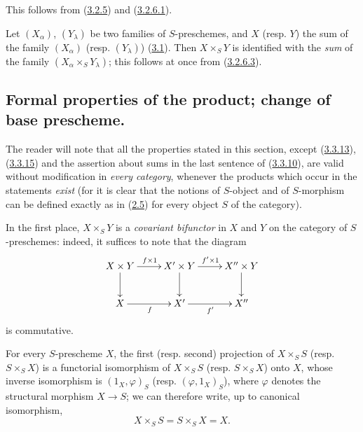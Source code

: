 This follows from (\hyperref[I.3.2.5]{3.2.5}) and
(\hyperref[I.3.2.6.1]{3.2.6.1}).

\begin{env}[3.2.8]
\label{I.3.2.8}
Let $(X_\alpha)$, $(Y_\lambda)$ be two families of $S$-preschemes, and $X$
(resp. $Y$) the sum of the family $(X_\alpha)$ (resp. $(Y_\lambda)$)
(\hyperref[subsection:I.3.1]{3.1}). Then $X\times_S Y$ is identified with the
\emph{sum} of the family $(X_\alpha\times_S Y_\lambda)$; this follows
at once from (\hyperref[I.3.2.6.3]{3.2.6.3}).
\end{env}

\subsection{Formal properties of the product; change of base prescheme.}
\label{subsection:I.3.3}

\begin{env}[3.3.1]
\label{I.3.3.1}
The reader will note that all the properties stated in this section,
except (\hyperref[I.3.3.13]{3.3.13}), (\hyperref[I.3.3.15]{3.3.15}) and the assertion about sums in the last sentence of
(\hyperref[I.3.3.10]{3.3.10}), are valid without modification in
\emph{every category}, whenever the products which occur in
the statements \emph{exist} (for it is clear that the notions of $S$-object and
of $S$-morphism can be defined exactly as in
(\hyperref[subsection:I.2.5]{2.5}) for every object $S$ of the category).
\end{env}

\begin{env}[3.3.2]
\label{I.3.3.2}
In the first place, $X\times_S Y$ is a \emph{covariant bifunctor} in $X$ and
$Y$ on the category of $S$-preschemes: indeed, it suffices to note
that the diagram
\[
  \xymatrix{
    X\times Y\ar[r]^{f\times 1}\ar[d] &
    X'\times Y\ar[r]^{f'\times 1}\ar[d] &
    X''\times Y\ar[d]\\
    X\ar[r]_f & X'\ar[r]_{f'} & X''
  }
\]
is commutative.
\end{env}

\begin{proposition}[3.3.3]
\label{I.3.3.3}
For every $S$-prescheme $X$, the first (resp. second) projection of
$X\times_S S$ (resp. $S\times_S X$) is a functorial isomorphism of
$X\times_S S$ (resp. $S\times_S X$) onto $X$, whose inverse isomorphism
is $(1_X,\varphi)_S$ (resp. $(\varphi,1_X)_S$), where $\varphi$ denotes
the structural morphism $X\to S$; we can therefore write, up to canonical
isomorphism,
\[
  X\times_S S=S\times_S X=X.
\]
\end{proposition}

